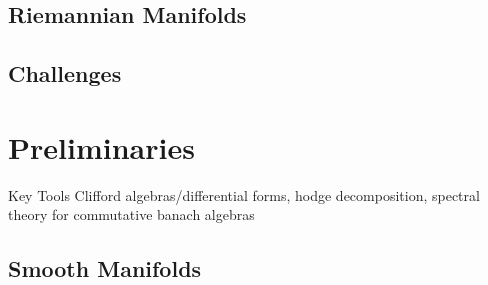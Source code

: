 \documentclass[aspectratio=169]{beamer}
\begin{document}
\subsection{Riemannian Manifolds}


\subsection{Challenges}



\section{Preliminaries}

\begin{frame}{Key Tools}
    Clifford algebras/differential forms, hodge decomposition, spectral theory for commutative banach algebras
\end{frame}


\subsection{Smooth Manifolds}
\end{document}
